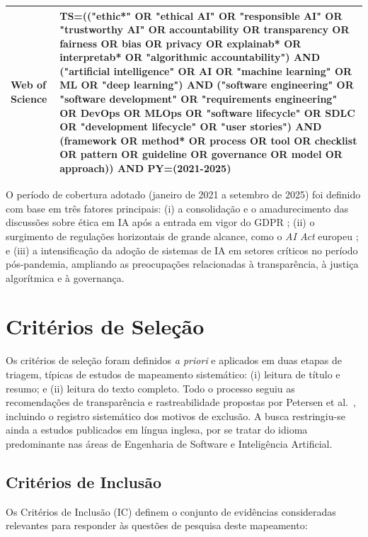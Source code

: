 \begin{table}[htbp]
\begin{tabular}{p{1.5cm}p{12.5cm}}
    \hline
    \addlinespace
    Web of Science & TS=(("ethic*" OR "ethical AI" OR "responsible AI" OR "trustworthy AI" OR accountability OR transparency OR fairness OR bias OR privacy OR explainab* OR interpretab* OR "algorithmic accountability") AND ("artificial intelligence" OR AI OR "machine learning" OR ML OR "deep learning") AND ("software engineering" OR "software development" OR "requirements engineering" OR DevOps OR MLOps OR "software lifecycle" OR SDLC OR "development lifecycle" OR "user stories") AND (framework OR method* OR process OR tool OR checklist OR pattern OR guideline OR governance OR model OR approach)) AND PY=(2021-2025) \\
  \hline
\end{tabular}
\end{table}

O período de cobertura adotado (janeiro de 2021 a setembro de 2025) foi definido com base em três fatores principais: (i) a consolidação e o amadurecimento das discussões sobre ética em IA após a entrada em vigor do GDPR \cite{GDPR2016}; (ii) o surgimento de regulações horizontais de grande alcance, como o \textit{AI Act} europeu \cite{EUAIAct2024}; e (iii) a intensificação da adoção de sistemas de IA em setores críticos no período pós-pandemia, ampliando as preocupações relacionadas à transparência, à justiça algorítmica e à governança.

\section{Critérios de Seleção}
\label{sec:criteria}

Os critérios de seleção foram definidos \textit{a priori} e aplicados em duas etapas de triagem, típicas de estudos de mapeamento sistemático: (i) leitura de título e resumo; e (ii) leitura do texto completo. Todo o processo seguiu as recomendações de transparência e rastreabilidade propostas por Petersen et al.~\cite{Petersen2015}, incluindo o registro sistemático dos motivos de exclusão. A busca restringiu-se ainda a estudos publicados em língua inglesa, por se tratar do idioma predominante nas áreas de Engenharia de Software e Inteligência Artificial.

\subsection{Critérios de Inclusão}

Os Critérios de Inclusão (IC) definem o conjunto de evidências consideradas relevantes para responder às questões de pesquisa deste mapeamento:

